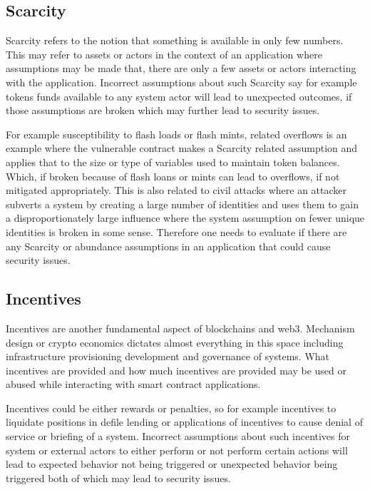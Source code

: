 \subsection{Scarcity}\label{scarcity}

Scarcity refers to the notion that something is available in only few
numbers. This may refer to assets or actors in the context of an
application where assumptions may be made that, there are only a few
assets or actors interacting with the application. Incorrect assumptions
about such Scarcity say for example tokens funds available to any system
actor will lead to unexpected outcomes, if those assumptions are broken
which may further lead to security issues.

For example susceptibility to flash loads or flash mints, related
overflows is an example where the vulnerable contract makes a Scarcity
related assumption and applies that to the size or type of variables
used to maintain token balances. Which, if broken because of flash loans
or mints can lead to overflows, if not mitigated appropriately. This is
also related to civil attacks where an attacker subverts a system by
creating a large number of identities and uses them to gain a
disproportionately large influence where the system assumption on fewer
unique identities is broken in some sense. Therefore one needs to
evaluate if there are any Scarcity or abundance assumptions in an
application that could cause security issues.

\subsection{Incentives}\label{incentives}

Incentives are another fundamental aspect of blockchains and web3.
Mechanism design or crypto economics dictates almost everything in this
space including infrastructure provisioning development and governance
of systems. What incentives are provided and how much incentives are
provided may be used or abused while interacting with smart contract
applications.

Incentives could be either rewards or penalties, so for example
incentives to liquidate positions in defile lending or applications of
incentives to cause denial of service or briefing of a system. Incorrect
assumptions about such incentives for system or external actors to
either perform or not perform certain actions will lead to expected
behavior not being triggered or unexpected behavior being triggered both
of which may lead to security issues.

